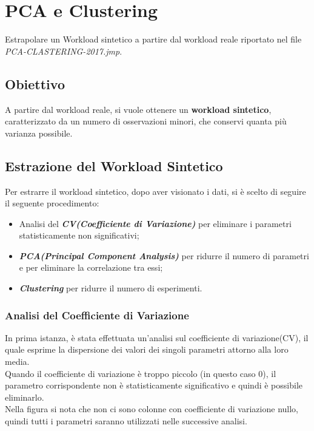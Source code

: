 
\chapter{PCA e Clustering}
Estrapolare un Workload sintetico a partire dal workload reale riportato nel file
 \textit{PCA-CLASTERING-2017.jmp}.

\section{Obiettivo}
A partire dal workload reale, si vuole ottenere un \textbf{workload sintetico},
caratterizzato da un numero di osservazioni minori, che conservi quanta
più varianza possibile.

\section{Estrazione del Workload Sintetico}
Per estrarre il workload sintetico, dopo aver visionato i dati, si è scelto
di seguire il seguente procedimento:

\begin{itemize}
  \item Analisi del \textbf{\textit{CV(Coefficiente di Variazione)}} per
  eliminare i parametri statisticamente non significativi;
  \item \textbf{\textit{PCA(Principal Component Analysis)}} per ridurre il
  numero di parametri e per eliminare la correlazione tra essi;
  \item \textbf{\textit{Clustering}} per ridurre il numero di esperimenti.
\end{itemize}


\subsection{Analisi del Coefficiente di Variazione}
In prima istanza, è stata effettuata un'analisi sul coefficiente di variazione(CV),
il quale esprime la dispersione dei valori dei singoli parametri attorno alla loro media.\\
Quando il coefficiente di variazione è troppo piccolo (in questo caso 0), il parametro
corrispondente non è statisticamente significativo e quindi è possibile eliminarlo.\\
Nella figura si nota che non ci sono colonne con coefficiente di variazione nullo,
quindi tutti i parametri saranno utilizzati nelle successive analisi.

